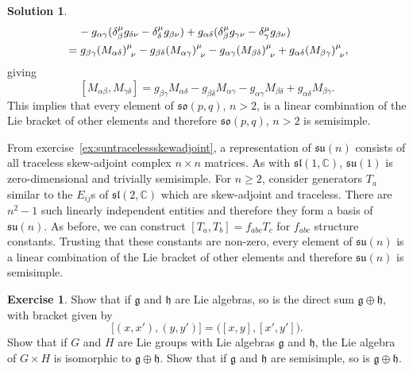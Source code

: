 \documentclass[11pt, a4paper]{report}
\theoremstyle{definition}
\newtheorem{exercise}{Exercise}[part]
\newtheorem{solution}{Solution}[part]
\newenvironment{ex}{\begin{exercise}}{\end{exercise}\pagebreak[1]}
\newenvironment{sol}{\begin{solution}}{\end{solution}\pagebreak[3]}
\renewcommand{\geq}{\geqslant}
\newcommand*{\pheq}{\ensuremath\mathrel{\phantom{=}}\negmedspace{}}
\begin{document}
\begin{sol}
\begin{align*}
        &\pheq
           - g_{\alpha\gamma} (\delta^\mu_\beta g_{\delta\nu}
                               - \delta^\mu_\delta g_{\beta\nu})
           + g_{\alpha\delta} (\delta^\mu_\beta g_{\gamma\nu}
                               - \delta^\mu_\gamma g_{\beta\nu}) \\
        &= g_{\beta\gamma} {{(M_{\alpha\delta})}^\mu\!}_\nu
           - g_{\beta\delta} {{(M_{\alpha\gamma})}^\mu\!}_\nu
           - g_{\alpha\gamma} {{(M_{\beta\delta})}^\mu\!}_\nu
           + g_{\alpha\delta} {{(M_{\beta\gamma})}^\mu\!}_\nu,
\end{align*}
giving
\[
    [M_{\alpha\beta}, M_{\gamma\delta}] = g_{\beta\gamma} M_{\alpha\delta}
                                          - g_{\beta\delta} M_{\alpha\gamma}
                                          - g_{\alpha\gamma} M_{\beta\delta}
                                          + g_{\alpha\delta} M_{\beta\gamma}.
\]
This implies that every element of $\mathfrak{so}(p, q)$, $n > 2$, is a linear combination of the Lie bracket of other elements and therefore $\mathfrak{so}(p, q)$, $n > 2$ is semisimple.

From exercise~\ref{ex:suntracelessskewadjoint}, a representation of $\mathfrak{su}(n)$ consists of all traceless skew-adjoint complex $n \times n$ matrices.
As with $\mathfrak{sl}(1, \mathbb{C})$, $\mathfrak{su}(1)$ is zero-dimensional and trivially semisimple.
For $n \geq 2$, consider generators $T_a$ similar to the $E_{ij}$s of $\mathfrak{sl}(2, \mathbb{C})$ which are skew-adjoint and traceless.
There are $n^2 - 1$ such linearly independent entities and therefore they form a basis of $\mathfrak{su}(n)$.
As before, we can construct $[T_a, T_b] = f_{abc} T_c$ for $f_{abc}$ structure constants.
Trusting that these constants are non-zero, every element of $\mathfrak{su}(n)$ is a linear combination of the Lie bracket of other elements and therefore $\mathfrak{su}(n)$ is semisimple.

\end{sol}

\begin{ex}

Show that if $\mathfrak{g}$ and $\mathfrak{h}$ are Lie algebras, so is the direct sum $\mathfrak{g} \oplus \mathfrak{h}$, with bracket given by
\[
    \bigl[(x, x'), (y, y') \bigr] = \bigl( [x, y], [x'\!, y'] \bigr).
\]
Show that if $G$ and $H$ are Lie groups with Lie algebras $\mathfrak{g}$ and $\mathfrak{h}$, the Lie algebra of $G \times H$ is isomorphic to $\mathfrak{g} \oplus \mathfrak{h}$.
Show that if $\mathfrak{g}$ and $\mathfrak{h}$ are semisimple, so is $\mathfrak{g} \oplus \mathfrak{h}$.

\end{ex}
\end{document}
